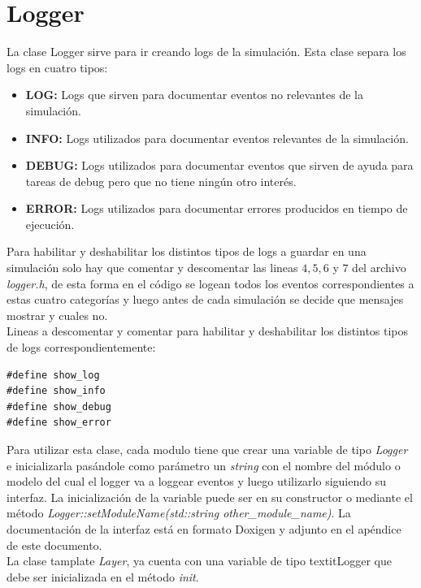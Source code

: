 \documentclass[10pt,a4paper]{article}
\begin{document}
\section{Logger}

La clase Logger sirve para ir creando logs de la simulación. Esta clase separa los logs en cuatro tipos:

\begin{itemize}
\item \textbf{LOG:} Logs que sirven para documentar eventos no relevantes de la simulación.
\item \textbf{INFO:} Logs utilizados para documentar eventos relevantes de la simulación.
\item \textbf{DEBUG:} Logs utilizados para documentar eventos que sirven de ayuda para tareas de debug pero que no tiene ningún otro interés.
\item \textbf{ERROR:} Logs utilizados para documentar errores producidos en tiempo de ejecución.
\end{itemize}

Para habilitar y deshabilitar los distintos tipos de logs a guardar en una simulación solo hay que comentar y descomentar las lineas $4,5,6$ y $7$ del archivo \textit{logger.h}, de esta forma en el código se logean todos los eventos correspondientes a estas cuatro categorías y luego antes de cada simulación se decide que mensajes mostrar y cuales no. \\

Lineas a descomentar y comentar para habilitar y deshabilitar los distintos tipos de logs correspondientemente:
\begin{lstlisting}
#define show_log
#define show_info
#define show_debug
#define show_error
\end{lstlisting}

Para utilizar esta clase, cada modulo tiene que crear una variable de tipo \textit{Logger} e inicializarla pasándole como parámetro un \textit{string} con el nombre del módulo o modelo del cual el logger va a loggear eventos y luego utilizarlo siguiendo su interfaz. La inicialización de la variable puede ser en su constructor o mediante el método \textit{Logger::setModuleName(std::string other\_module\_name)}. La documentación de la interfaz está en formato Doxigen y adjunto en el apéndice de este documento. \\

La clase tamplate \textit{Layer}, ya cuenta con una variable de tipo textit{Logger} que debe ser inicializada en el método \textit{init}.
\end{document}
